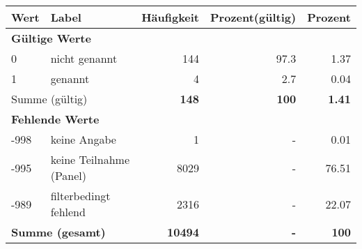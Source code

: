      \begin{longtable}{lXrrr}
     \toprule
     \textbf{Wert} & \textbf{Label} & \textbf{Häufigkeit} & \textbf{Prozent(gültig)} & \textbf{Prozent} \\
     \endhead
     \midrule
     \multicolumn{5}{l}{\textbf{Gültige Werte}}\\

     0 &
     \multicolumn{1}{X}{ nicht genannt   } &


       \num{144} &
       \num[round-mode=places,round-precision=2]{97.3} &
         \num[round-mode=places,round-precision=2]{1.37} \\

     1 &
     \multicolumn{1}{X}{ genannt   } &


       \num{4} &
       \num[round-mode=places,round-precision=2]{2.7} &
         \num[round-mode=places,round-precision=2]{0.04} \\
     \midrule
     \multicolumn{2}{l}{Summe (gültig)} &
       \textbf{\num{148}} &
     \textbf{\num{100}} &
       \textbf{\num[round-mode=places,round-precision=2]{1.41}} \\
     \multicolumn{5}{l}{\textbf{Fehlende Werte}}\\
       -998 &
       keine Angabe &
         \num{1} &
        - &
         \num[round-mode=places,round-precision=2]{0.01} \\
       -995 &
       keine Teilnahme (Panel) &
         \num{8029} &
        - &
         \num[round-mode=places,round-precision=2]{76.51} \\
       -989 &
       filterbedingt fehlend &
         \num{2316} &
        - &
         \num[round-mode=places,round-precision=2]{22.07} \\
     \midrule
     \multicolumn{2}{l}{\textbf{Summe (gesamt)}} &
          \textbf{\num{10494}} &
        \textbf{-} &
        \textbf{\num{100}} \\
     \bottomrule
     \end{longtable}
     
